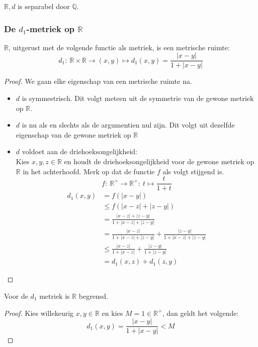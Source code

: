 \documentclass[main.tex]{subfiles}
\begin{document}
\begin{vb}
  $\mathbb{R},d$ is separabel door $\mathbb{Q}$.
\end{vb}

\subsubsection{De $d_1$-metriek op $\mathbb{R}$}
\label{sec:d_1-metriek-op}

\begin{vb}
  $\mathbb{R}$, uitgerust met de volgende functie als metriek, is een metrische ruimte:
  \[ d_{1}:\ \mathbb{R}\times\mathbb{R}\rightarrow (x,y) \mapsto d_{1}(x,y)=\frac{|x-y|}{1+|x-y|} \]
  \begin{proof}
    We gaan elke eigenschap van een metrische ruimte na.
    \begin{itemize}
    \item $d$ is symmestrisch.
      Dit volgt meteen uit de symmetrie van de gewone metriek op $\mathbb{R}$.
    \item $d$ is nu als en slechts als de argumentien nul zijn.
      Dit volgt uit dezelfde eigenschap van de gewone metriek op $\mathbb{R}$
    \item $d$ voldoet aan de driehoeksongelijkheid:\\
      Kies $x,y,z \in \mathbb{R}$ en houdt de driehoeksongelijkheid voor de gewone metriek op $\mathbb{R}$ in het achterhoofd.
      Merk op dat de functie $f$ als volgt stijgend is.
      \[ f:\ \mathbb{R}^{+} \rightarrow \mathbb{R}^{+}:\ t \mapsto \frac{t}{1+t} \]
      \begin{align*}
        d_{1}(x,y)
        &= f(|x-y|)\\
        &\le f(|x-z|+|z-y|)\\
        &= \frac{|x-z|+|z-y|}{1+|x-z|+|z-y|}\\
        &= \frac{|x-z|}{1+|x-z|+|z-y|}+\frac{|z-y|}{1+|x-z|+|z-y|}\\
        &\le \frac{|x-z|}{1+|x-z|}+\frac{|z-y|}{1+|z-y|}\\
        &= d_{1}(x,z) + d_{1}(z,y)
      \end{align*}
    \end{itemize}
  \end{proof}
\end{vb}

\begin{st}
  Voor de $d_{1}$ metriek is $\mathbb{R}$ begrensd.
  \begin{proof}
    Kies willekeurig $x,y\in\mathbb{R}$ en kies $M=1\in \mathbb{R}^{+}$, dan geldt het volgende:
    \[ d_{1}(x,y) = \frac{|x-y|}{1+|x-y|} < M \]
  \end{proof}
\end{st}
\end{document}
